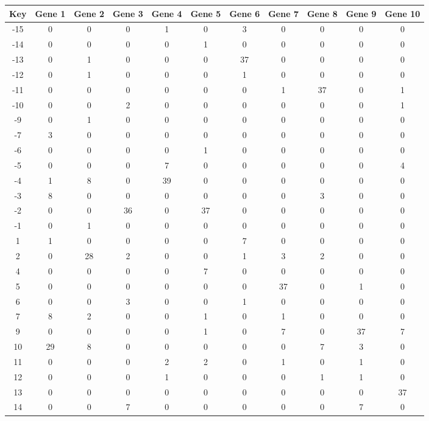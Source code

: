 \begin{tabular}{|c|c|c|c|c|c|c|c|c|c|c|}
\hline
Key & Gene 1 & Gene 2 & Gene 3 & Gene 4 & Gene 5 & Gene 6 & Gene 7 & Gene 8 & Gene 9 & Gene 10 \\
\hline
-15 & 0 & 0 & 0 & 1 & 0 & 3 & 0 & 0 & 0 & 0 \\
-14 & 0 & 0 & 0 & 0 & 1 & 0 & 0 & 0 & 0 & 0 \\
-13 & 0 & 1 & 0 & 0 & 0 & 37 & 0 & 0 & 0 & 0 \\
-12 & 0 & 1 & 0 & 0 & 0 & 1 & 0 & 0 & 0 & 0 \\
-11 & 0 & 0 & 0 & 0 & 0 & 0 & 1 & 37 & 0 & 1 \\
-10 & 0 & 0 & 2 & 0 & 0 & 0 & 0 & 0 & 0 & 1 \\
-9 & 0 & 1 & 0 & 0 & 0 & 0 & 0 & 0 & 0 & 0 \\
-7 & 3 & 0 & 0 & 0 & 0 & 0 & 0 & 0 & 0 & 0 \\
-6 & 0 & 0 & 0 & 0 & 1 & 0 & 0 & 0 & 0 & 0 \\
-5 & 0 & 0 & 0 & 7 & 0 & 0 & 0 & 0 & 0 & 4 \\
-4 & 1 & 8 & 0 & 39 & 0 & 0 & 0 & 0 & 0 & 0 \\
-3 & 8 & 0 & 0 & 0 & 0 & 0 & 0 & 3 & 0 & 0 \\
-2 & 0 & 0 & 36 & 0 & 37 & 0 & 0 & 0 & 0 & 0 \\
-1 & 0 & 1 & 0 & 0 & 0 & 0 & 0 & 0 & 0 & 0 \\
1 & 1 & 0 & 0 & 0 & 0 & 7 & 0 & 0 & 0 & 0 \\
2 & 0 & 28 & 2 & 0 & 0 & 1 & 3 & 2 & 0 & 0 \\
4 & 0 & 0 & 0 & 0 & 7 & 0 & 0 & 0 & 0 & 0 \\
5 & 0 & 0 & 0 & 0 & 0 & 0 & 37 & 0 & 1 & 0 \\
6 & 0 & 0 & 3 & 0 & 0 & 1 & 0 & 0 & 0 & 0 \\
7 & 8 & 2 & 0 & 0 & 1 & 0 & 1 & 0 & 0 & 0 \\
9 & 0 & 0 & 0 & 0 & 1 & 0 & 7 & 0 & 37 & 7 \\
10 & 29 & 8 & 0 & 0 & 0 & 0 & 0 & 7 & 3 & 0 \\
11 & 0 & 0 & 0 & 2 & 2 & 0 & 1 & 0 & 1 & 0 \\
12 & 0 & 0 & 0 & 1 & 0 & 0 & 0 & 1 & 1 & 0 \\
13 & 0 & 0 & 0 & 0 & 0 & 0 & 0 & 0 & 0 & 37 \\
14 & 0 & 0 & 7 & 0 & 0 & 0 & 0 & 0 & 7 & 0 \\
\hline
\end{tabular}